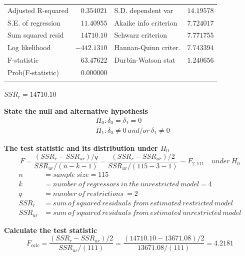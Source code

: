 \documentclass[12pt]{report}
\begin{document}
\begin{table}[H]
\begin{tabular}{lrrrr}
		\multicolumn{1}{l}{Adjusted R-squared}&\multicolumn{1}{r}{$0.354021$}&\multicolumn{2}{l}{S.D. dependent var}&\multicolumn{1}{r}{$14.19578$}\\
		\multicolumn{1}{l}{S.E. of regression}&\multicolumn{1}{r}{$11.40955$}&\multicolumn{2}{l}{Akaike info criterion}&\multicolumn{1}{r}{$7.724017$}\\
		\multicolumn{1}{l}{Sum squared resid}&\multicolumn{1}{r}{$14710.10$}&\multicolumn{2}{l}{Schwarz criterion}&\multicolumn{1}{r}{$7.771755$}\\
		\multicolumn{1}{l}{Log likelihood}&\multicolumn{1}{r}{$-442.1310$}&\multicolumn{2}{l}{Hannan-Quinn criter.}&\multicolumn{1}{r}{$7.743394$}\\
		\multicolumn{1}{l}{F-statistic}&\multicolumn{1}{r}{$63.47622$}&\multicolumn{2}{l}{Durbin-Watson stat}&\multicolumn{1}{r}{$1.240656$}\\
		\multicolumn{1}{l}{Prob(F-statistic)}&\multicolumn{1}{r}{$0.000000$}&\multicolumn{1}{c}{}&\multicolumn{1}{c}{}&\multicolumn{1}{c}{}\\
		[4.5pt] \hline \\ [-4.5pt]
	\end{tabular}
\end{table}\centering $SSR_{r} = 14710.10$

\justify
\noindent \textbf{State the null and alternative hypothesis}
\begin{align*}
	&H_0: \delta_0 = \delta_1 = 0 \\
	&H_1: \delta_0 \neq 0\ and/or\ \delta_1 \neq 0
\end{align*}

\noindent \textbf{The test statistic and its distribution under $H_0$}
$$F = \dfrac{(SSR_r - SSR_{ur})/q}{SSR_{ur}/(n-k-1)} = \dfrac{(SSR_r - SSR_{ur})/2}{SSR_{ur}/(115-3-1)} \sim F_{2,111} \quad under\ H_0$$
\begin{align*}
n &= sample\ size = 115 \\
k &= number\ of\ regressors\ in\ the\ unrestricted\ model = 4 \\
q &= number\ of\ restrictions\ = 2 \\
SSR_{r} &= sum\ of\ squared\ residuals\ from\ estimated\ restricted\ model \\
SSR_{ur} &= sum\ of\ squared\ residuals\ from\ estimated\ unrestricted\ model
\end{align*}

\noindent \textbf{Calculate the test statistic}
$$F_{calc} = \dfrac{(SSR_r - SSR_{ur})/2}{SSR_{ur}/(111)} = \dfrac{(14710.10-13671.08)/2}{13671.08/(111)} = 4.2181 $$
\end{document}
